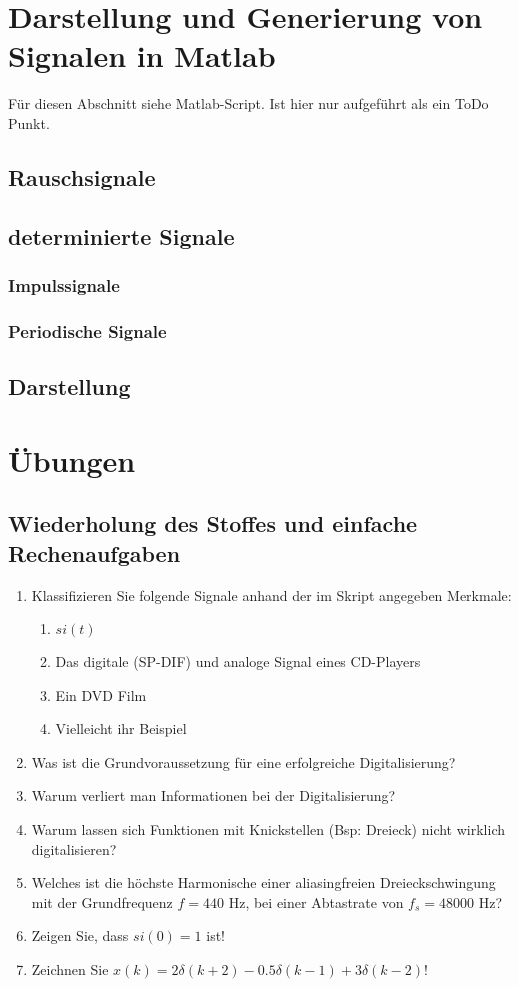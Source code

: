 {
\section{Darstellung und Generierung von Signalen in Matlab}
Für diesen Abschnitt siehe Matlab-Script. Ist hier nur aufgeführt als ein ToDo Punkt.

\subsection{Rauschsignale}
\subsection{determinierte Signale}
\subsubsection{Impulssignale}
\subsubsection{Periodische Signale}

\subsection{Darstellung}
}

\section{Übungen}
\subsection{Wiederholung des Stoffes und einfache Rechenaufgaben}
\begin{enumerate}
    \item Klassifizieren Sie folgende Signale anhand der im Skript angegeben Merkmale:
    \begin{enumerate}
        \item $si(t)$
        \item Das digitale (SP-DIF) und analoge Signal eines CD-Players
        \item Ein DVD Film
        \item Vielleicht ihr Beispiel
    \end{enumerate}
    \item Was ist die Grundvoraussetzung für eine erfolgreiche Digitalisierung?
    \item Warum verliert man Informationen bei der Digitalisierung?
    \item Warum lassen sich Funktionen mit Knickstellen (Bsp: Dreieck) nicht wirklich digitalisieren?
    \item Welches ist die höchste Harmonische einer aliasingfreien Dreieckschwingung mit der Grundfrequenz
    $f = 440$ Hz, bei einer Abtastrate von $f_s = 48000$ Hz?
    \item Zeigen Sie, dass $si(0) = 1$ ist!
    \item Zeichnen Sie $x(k) = 2\delta(k+2) - 0.5\delta(k-1) + 3\delta(k-2)$!
\end{enumerate}

